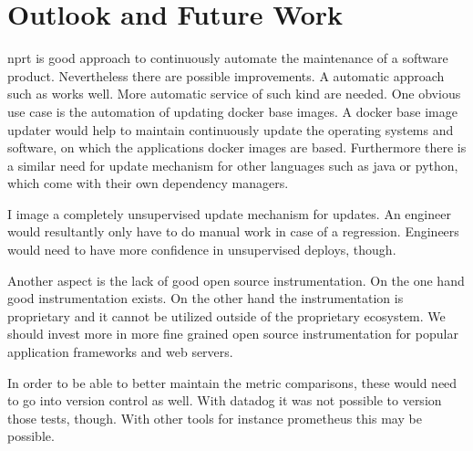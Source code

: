 \section{Outlook and Future Work}

\gls{nprt} is good approach to continuously automate the maintenance of a software
product. Nevertheless there are possible improvements. A automatic approach such as
\gemupdater works well. More automatic service of such kind are needed. One obvious use
case is the automation of updating docker base images. A docker base image updater would
help to maintain continuously update the operating systems and software, on which the
applications docker images are based. Furthermore there is a similar need for update
mechanism for other languages such as java or python, which come with their own dependency
managers.

I image a completely unsupervised update mechanism for updates. An engineer would
resultantly only have to do manual work in case of a regression. Engineers would need to
have more confidence in unsupervised deploys, though.

Another aspect is the lack of good open source instrumentation. On the one hand good
instrumentation exists. On the other hand the instrumentation is proprietary and it cannot
be utilized outside of the proprietary ecosystem. We should invest more in more fine
grained open source instrumentation for popular application frameworks and web servers.

In order to be able to better maintain the metric comparisons, these would need to go into
version control as well. With datadog it was not possible to version those tests,
though. With other tools for instance prometheus this may be possible.

